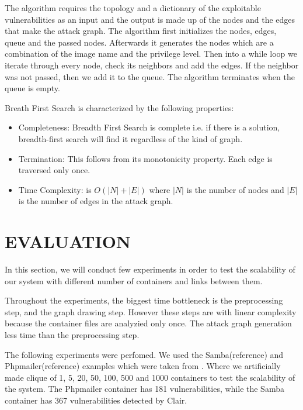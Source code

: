 \documentclass[letterpaper, 10 pt, conference]{ieeeconf}  %
\begin{document}
The algorithm requires the topology and a dictionary of the exploitable vulnerabilities as an input and the output is made up of the nodes and the edges that make the attack graph. 
The algorithm first initializes the nodes, edges, queue and the passed nodes. Afterwards it generates the nodes which are a combination of the image name and the privilege level.
Then into a while loop we iterate through every node, check its neighbors and add the edges. If the neighbor was not passed, then we add it to the queue. The algorithm terminates when the queue is empty.

Breath First Search is characterized by the following properties:

\begin{itemize}
 \item Completeness: Breadth First Search is complete i.e. if there is a solution, breadth-first search will find it regardless of the kind of graph.
 \item Termination: This follows from its monotonicity property. Each edge is traversed only once.
 \item Time Complexity: is $O(|N| + |E|)$ where $|N|$ is the number of nodes and $|E|$ is the number of edges in the attack graph.
\end{itemize}
\section{EVALUATION}

In this section, we will conduct few experiments in order to test the scalability of our system with different number of containers and links between them.

Throughout the experiments, the biggest time bottleneck is the preprocessing step, and the graph drawing step. However these steps are with linear complexity because the container files are analyzied only once. The attack graph generation less time than the preprocessing step.

The following experiments were perfomed. We used the Samba(reference) and Phpmailer(reference) examples which were taken from . Where we artificially made clique of 1, 5, 20, 50, 100, 500 and 1000 containers to test the scalability of the system. The Phpmailer container has 181 vulnerabilities, while the Samba container has 367 vulnerabilities detected by Clair.
\end{document}
